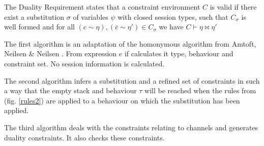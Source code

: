 The Duality Requirement states that a constraint environment $C$ is valid if there exist a substitution $\sigma$ of variables $\psi$ with closed session types, such that $C_\sigma$ is well formed and for all $(c\sim \eta), (\bar{c} \sim \eta') \in C_\sigma$ we have $C \vdash \eta \bowtie \eta'$

The first algorithm is an adaptation of the homonymous algorithm from Amtoft, Neilsen \& Neilsen \cite{amtoft}. From expression $e$ if calculates it type, behaviour and constraint set. No session information is calculated. 

The second algorithm infers a substitution and a refined set of constraints in such a way that the empty stack and behaviour $\tau$ will be reached when the rules from (fig. \ref{rules2}) are applied to a behaviour on which the substitution has been applied. 

The third algorithm deals with the constraints relating to channels and generates duality constraints. It also checks these constraints. 